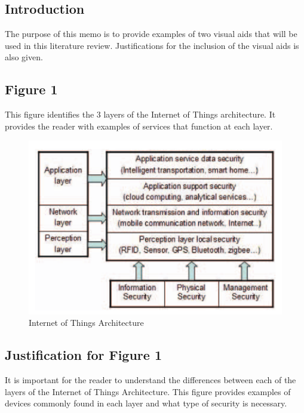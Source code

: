 \documentclass[letterpaper, 12pt]{texMemo}
\begin{document}
\maketitle
\begin{flushleft}
\subsection*{Introduction}
The purpose of this memo is to provide examples of two visual aids that will be used in this literature review. Justifications for the inclusion of the visual aids is also given.

\subsection*{Figure 1}
This figure identifies the 3 layers of the Internet of Things architecture. It provides the reader with examples of services that function at each layer.


\begin{figure}[h!]
	\includegraphics[width=\linewidth]{figure2.png}
	\caption{Internet of Things Architecture}
	\label{fig:arch}
\end{figure}

\subsection*{Justification for Figure 1}
It is important for the reader to understand the differences between each of the layers of the Internet of Things Architecture. 
This figure provides examples of devices commonly found in each layer and what type of security is necessary. 


\end{flushleft}
\end{document}
